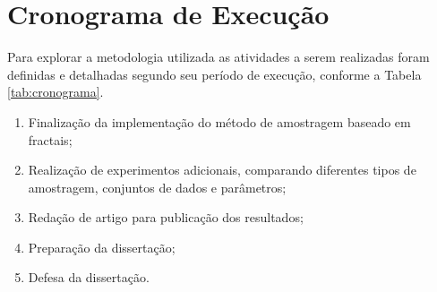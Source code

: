\section{Cronograma de Execução}
	\label{sec:cronograma}

Para explorar a metodologia utilizada as atividades a serem realizadas foram
definidas e detalhadas segundo seu período de execução, conforme a Tabela
\ref{tab:cronograma}.

\begin{enumerate}
\item Finalização da implementação do método de amostragem baseado em fractais;
\item Realização de experimentos adicionais, comparando diferentes tipos de 
		  amostragem, conjuntos de dados e parâmetros;
\item Redação de artigo para publicação dos resultados;
\item Preparação da dissertação;
\item Defesa da dissertação.    
\end{enumerate}  

